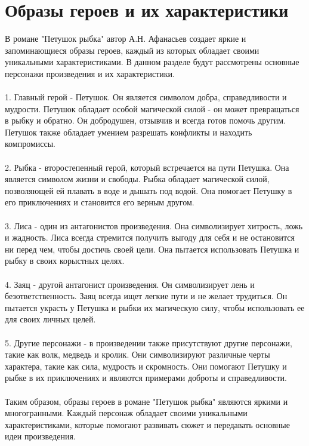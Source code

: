 \documentclass{article}
\begin{document}
\section{Образы героев и их характеристики}
В романе "{}Петушок рыбка"{} автор А.Н. Афанасьев создает яркие и запоминающиеся образы героев, каждый из которых обладает своими уникальными характеристиками. В данном разделе будут рассмотрены основные персонажи произведения и их характеристики.\\
~\\
1. Главный герой - Петушок. Он является символом добра, справедливости и мудрости. Петушок обладает особой магической силой - он может превращаться в рыбку и обратно. Он добродушен, отзывчив и всегда готов помочь другим. Петушок также обладает умением разрешать конфликты и находить компромиссы.\\
~\\
2. Рыбка - второстепенный герой, который встречается на пути Петушка. Она является символом жизни и свободы. Рыбка обладает магической силой, позволяющей ей плавать в воде и дышать под водой. Она помогает Петушку в его приключениях и становится его верным другом.\\
~\\
3. Лиса - один из антагонистов произведения. Она символизирует хитрость, ложь и жадность. Лиса всегда стремится получить выгоду для себя и не остановится ни перед чем, чтобы достичь своей цели. Она пытается использовать Петушка и рыбку в своих корыстных целях.\\
~\\
4. Заяц - другой антагонист произведения. Он символизирует лень и безответственность. Заяц всегда ищет легкие пути и не желает трудиться. Он пытается украсть у Петушка и рыбки их магическую силу, чтобы использовать ее для своих личных целей.\\
~\\
5. Другие персонажи - в произведении также присутствуют другие персонажи, такие как волк, медведь и кролик. Они символизируют различные черты характера, такие как сила, мудрость и скромность. Они помогают Петушку и рыбке в их приключениях и являются примерами доброты и справедливости.\\
~\\
Таким образом, образы героев в романе "{}Петушок рыбка"{} являются яркими и многогранными. Каждый персонаж обладает своими уникальными характеристиками, которые помогают развивать сюжет и передавать основные идеи произведения.
\end{document}
